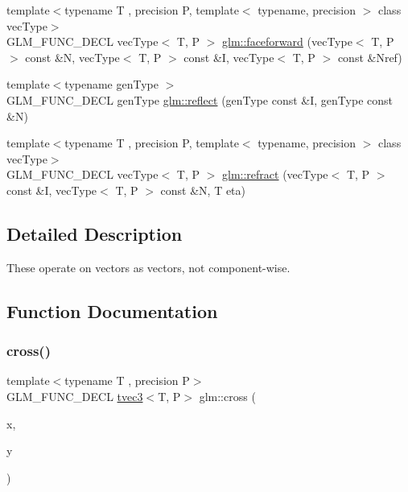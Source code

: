 \begin{DoxyCompactItemize}
{\footnotesize template$<$typename T , precision P, template$<$ typename, precision $>$ class vec\+Type$>$ }\\G\+L\+M\+\_\+\+F\+U\+N\+C\+\_\+\+D\+E\+CL vec\+Type$<$ T, P $>$ \hyperlink{group__core__func__geometric_gaea854e5aec1b5839832ac2dfc7cd3c0d}{glm\+::faceforward} (vec\+Type$<$ T, P $>$ const \&N, vec\+Type$<$ T, P $>$ const \&I, vec\+Type$<$ T, P $>$ const \&Nref)
\item 
{\footnotesize template$<$typename gen\+Type $>$ }\\G\+L\+M\+\_\+\+F\+U\+N\+C\+\_\+\+D\+E\+CL gen\+Type \hyperlink{group__core__func__geometric_gab63646fc36b81cf69d3ce123a72f76f2}{glm\+::reflect} (gen\+Type const \&I, gen\+Type const \&N)
\item 
{\footnotesize template$<$typename T , precision P, template$<$ typename, precision $>$ class vec\+Type$>$ }\\G\+L\+M\+\_\+\+F\+U\+N\+C\+\_\+\+D\+E\+CL vec\+Type$<$ T, P $>$ \hyperlink{group__core__func__geometric_gab7e7cdf4403931a5f7b74560ad64159b}{glm\+::refract} (vec\+Type$<$ T, P $>$ const \&I, vec\+Type$<$ T, P $>$ const \&N, T eta)
\end{DoxyCompactItemize}


\subsection{Detailed Description}
These operate on vectors as vectors, not component-\/wise. 

\subsection{Function Documentation}
\mbox{\label{group__core__func__geometric_gafe2cae8cb26fd44be62aee97369d0af8}} 
\subsubsection{\texorpdfstring{cross()}{cross()}}
{\footnotesize\ttfamily template$<$typename T , precision P$>$ \\
G\+L\+M\+\_\+\+F\+U\+N\+C\+\_\+\+D\+E\+CL \hyperlink{structglm_1_1tvec3}{tvec3}$<$T, P$>$ glm\+::cross (\begin{DoxyParamCaption}\item[{\hyperlink{structglm_1_1tvec3}{tvec3}$<$ T, P $>$ const \&}]{x,  }\item[{\hyperlink{structglm_1_1tvec3}{tvec3}$<$ T, P $>$ const \&}]{y }\end{DoxyParamCaption})}

